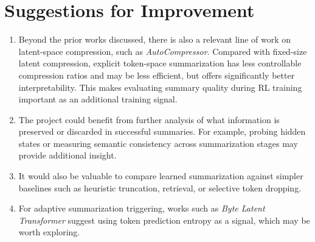 \documentclass{article}
\begin{document}
\section{Suggestions for Improvement}

\begin{enumerate}
    \item Beyond the prior works discussed, there is also a relevant line of work on latent-space compression, such as \textit{AutoCompressor}. Compared with fixed-size latent compression, explicit token-space summarization has less controllable compression ratios and may be less efficient, but offers significantly better interpretability. This makes evaluating summary quality during RL training important as an additional training signal.
    
    \item The project could benefit from further analysis of what information is preserved or discarded in successful summaries. For example, probing hidden states or measuring semantic consistency across summarization stages may provide additional insight.
    
    \item It would also be valuable to compare learned summarization against simpler baselines such as heuristic truncation, retrieval, or selective token dropping.
    
    \item For adaptive summarization triggering, works such as \textit{Byte Latent Transformer} suggest using token prediction entropy as a signal, which may be worth exploring.
\end{enumerate}
\end{document}
